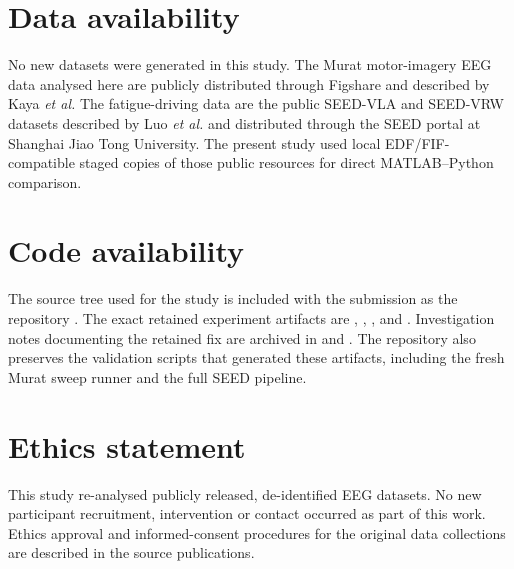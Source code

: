 \section*{Data availability}

No new datasets were generated in this study. The Murat motor-imagery EEG data analysed here are publicly distributed through Figshare and described by Kaya \emph{et al.}\supercite{kaya2018} The fatigue-driving data are the public SEED-VLA and SEED-VRW datasets described by Luo \emph{et al.}\supercite{luo2024} and distributed through the SEED portal at Shanghai Jiao Tong University. The present study used local EDF/FIF-compatible staged copies of those public resources for direct MATLAB--Python comparison.

\section*{Code availability}

The source tree used for the study is included with the submission as the repository . The exact retained experiment artifacts are , , , and . Investigation notes documenting the retained fix are archived in  and . The repository also preserves the validation scripts that generated these artifacts, including the fresh Murat sweep runner and the full SEED pipeline.

\section*{Ethics statement}

This study re-analysed publicly released, de-identified EEG datasets. No new participant recruitment, intervention or contact occurred as part of this work. Ethics approval and informed-consent procedures for the original data collections are described in the source publications.\supercite{kaya2018,luo2024}
